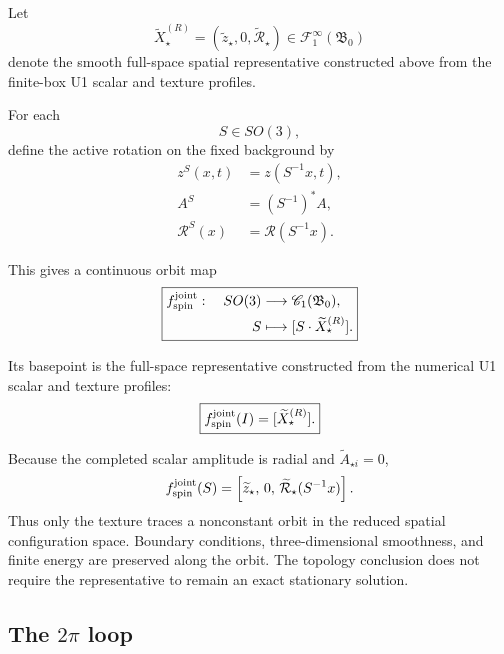 \documentclass[11pt]{article}
\begin{document}
Let
\begin{equation}
\widetilde X_\star^{(R)}
=
(\widetilde z_\star,0,\widetilde{\mathcal R}_\star)
\in
\mathscr F_1^\infty(\mathfrak B_0)
\end{equation}
denote the smooth full-space spatial representative constructed above from the finite-box U1 scalar and texture profiles.

For each
\begin{equation}
S\in SO(3),
\end{equation}
define the active rotation on the fixed background by
\begin{align}
z^S(x,t)
&=
z(S^{-1}x,t),
\\
A^S
&=
(S^{-1})^\ast A,
\\
\mathcal R^S(x)
&=
\mathcal R(S^{-1}x).
\end{align}

This gives a continuous orbit map
\begin{equation}
\boxed{
\begin{aligned}
f_{\rm spin}^{\rm joint}:\quad
SO(3)&\longrightarrow\mathscr C_1(\mathfrak B_0),
\\
S&\longmapsto[S\cdot\widetilde X_\star^{(R)}].
\end{aligned}
}
\end{equation}

Its basepoint is the full-space representative constructed from the numerical U1 scalar and texture profiles:
\begin{equation}
\boxed{
f_{\rm spin}^{\rm joint}(I)
=
[\widetilde X_\star^{(R)}].
}
\end{equation}

Because the completed scalar amplitude is radial and \(\widetilde A_{\star i}=0\),
\begin{equation}
f_{\rm spin}^{\rm joint}(S)
=
\left[
\widetilde z_\star,\,
0,\,
\widetilde{\mathcal R}_\star(S^{-1}x)
\right].
\end{equation}
Thus only the texture traces a nonconstant orbit in the reduced spatial configuration space. Boundary conditions, three-dimensional smoothness, and finite energy are preserved along the orbit. The topology conclusion does not require the representative to remain an exact stationary solution.

\subsection{The \texorpdfstring{\(2\pi\)}{2pi} loop}
\end{document}
